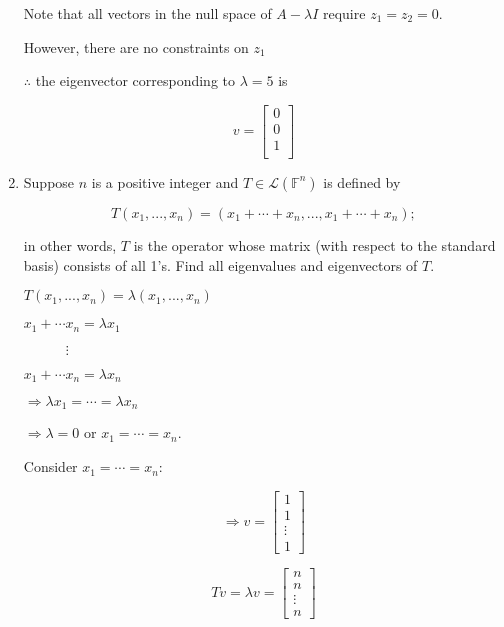\documentclass[fleqn]{article}
\makeatletter
\newenvironment{equationCenter}{\@fleqnfalse\begin{equation*}}{\end{equation*}}
\makeatother
\begin{document}
\begin{enumerate}[nolistsep]
		Note that all vectors in the null space of $A - {\lambda}I$ require $z_1 = z_2 = 0$.
		
		However, there are no constraints on $z_1$
		
		$\therefore$ the eigenvector corresponding to $\lambda = 5$ is
		
		\begin{equation*}
			v = \begin{bmatrix}
				0 \\
				0 \\
				1 \\
			\end{bmatrix}
		\end{equation*}
		
		\item Suppose $n$ is a positive integer and $T \in \mathcal{L}(\mathbb{F}^n)$ is defined by
		
			\begin{equationCenter}
				T(x_1,...,x_n) = (x_1 + \cdots + x_n,..., x_1 + \cdots + x_n);
			\end{equationCenter}
			
			in other words, $T$ is the operator whose matrix (with respect to the standard basis) consists of all 1's. Find all eigenvalues and eigenvectors of $T$.
			
			$T(x_1,...,x_n) = \lambda(x_1,...,x_n)$
			
			$x_1 + \cdots x_n = {\lambda}x_1$
			
			$\qquad\quad\vdots$
			
			$x_1 + \cdots x_n = {\lambda}x_n$
			
			$\Rightarrow {\lambda}x_1 = \cdots = {\lambda}x_n$
			
			$\Rightarrow \lambda = 0$ or $x_1 = \cdots = x_n$.
			
			Consider $x_1 = \cdots = x_n$:
			
			\begin{equation*}
				\Rightarrow v = \begin{bmatrix}
					1 	   \\
					1      \\
					\vdots \\
					1      
				\end{bmatrix}
			\end{equation*}
			
			\begin{equation*}
				Tv = {\lambda}v = \begin{bmatrix}
					n 	   \\
					n      \\
					\vdots \\
					n      
				\end{bmatrix}
			\end{equation*}
			

\end{enumerate}
\end{document}
